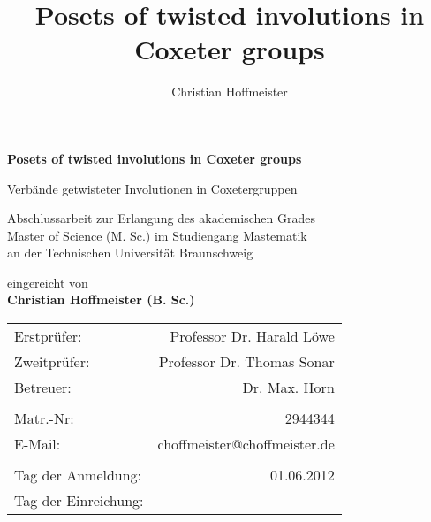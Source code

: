 \title{Posets of twisted involutions in Coxeter groups}
\author{Christian Hoffmeister}

\begin{titlepage}
\begin{center}
{\Large \bf Posets of twisted involutions in Coxeter groups}

{\large Verbände getwisteter Involutionen in Coxetergruppen}

\vspace*{4cm}
Abschlussarbeit zur Erlangung des akademischen Grades\\Master of Science (M. Sc.) im Studiengang Mastematik\\an der Technischen Universität Braunschweig

\vspace*{4cm}
eingereicht von \\
{\Large \bf Christian Hoffmeister (B. Sc.)}

\vspace*{4cm}
\begin{tabular}{lr}
	Erstprüfer: & Professor Dr. Harald Löwe \\
	Zweitprüfer: & Professor Dr. Thomas Sonar \\
	Betreuer: & Dr. Max. Horn \\
	\vspace*{0.5em} & \\
	Matr.-Nr: & 2944344 \\
	E-Mail: & choffmeister@choffmeister.de \\
	\vspace*{0.5em} & \\
	Tag der Anmeldung: & 01.06.2012 \\
	Tag der Einreichung: & \\
\end{tabular}
\end{center}
\end{titlepage}